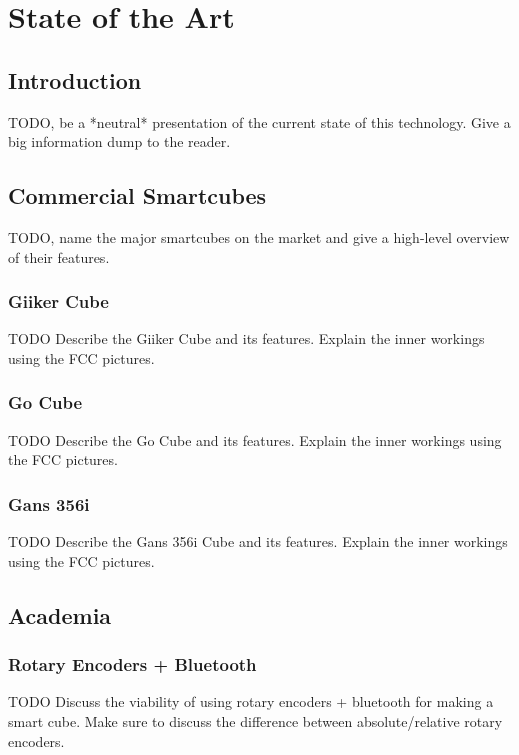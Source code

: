 
\chapter{State of the Art} %

\label{Chapter3} %


\section{Introduction}

TODO, be a *neutral* presentation of the current state of this technology. Give a big information dump to the reader.


\section{Commercial Smartcubes}

TODO, name the major smartcubes on the market and give a high-level overview of their features.

\subsection{Giiker Cube}
TODO Describe the Giiker Cube and its features. Explain the inner workings using the FCC pictures.

\subsection{Go Cube}
TODO Describe the Go Cube and its features. Explain the inner workings using the FCC pictures.

\subsection{Gans 356i}
TODO Describe the Gans 356i Cube and its features. Explain the inner workings using the FCC pictures.


\section{Academia}

\subsection{Rotary Encoders + Bluetooth}
TODO Discuss the viability of using rotary encoders + bluetooth for making a smart cube. Make sure to discuss the difference between absolute/relative rotary encoders.


